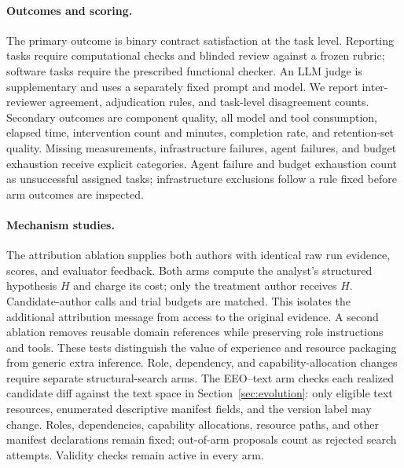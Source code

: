 \paragraph{Outcomes and scoring.}
The primary outcome is binary contract satisfaction at the task level. Reporting tasks require computational checks and blinded review against a frozen rubric; software tasks require the prescribed functional checker. An LLM judge is supplementary and uses a separately fixed prompt and model. We report inter-reviewer agreement, adjudication rules, and task-level disagreement counts. Secondary outcomes are component quality, all model and tool consumption, elapsed time, intervention count and minutes, completion rate, and retention-set quality. Missing measurements, infrastructure failures, agent failures, and budget exhaustion receive explicit categories. Agent failure and budget exhaustion count as unsuccessful assigned tasks; infrastructure exclusions follow a rule fixed before arm outcomes are inspected.

\paragraph{Mechanism studies.}
The attribution ablation supplies both authors with identical raw run evidence, scores, and evaluator feedback. Both arms compute the analyst's structured hypothesis $H$ and charge its cost; only the treatment author receives $H$. Candidate-author calls and trial budgets are matched. This isolates the additional attribution message from access to the original evidence. A second ablation removes reusable domain references while preserving role instructions and tools. These tests distinguish the value of experience and resource packaging from generic extra inference. Role, dependency, and capability-allocation changes require separate structural-search arms. The EEO--text arm checks each realized candidate diff against the text space in Section~\ref{sec:evolution}: only eligible text resources, enumerated descriptive manifest fields, and the version label may change. Roles, dependencies, capability allocations, resource paths, and other manifest declarations remain fixed; out-of-arm proposals count as rejected search attempts. Validity checks remain active in every arm.

